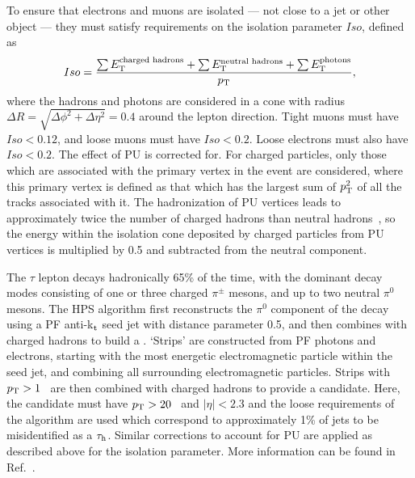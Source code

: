To ensure that electrons and muons are isolated --- not close to a jet or other object --- they must satisfy requirements on the isolation parameter $Iso$, defined as
\begin{equation}
Iso = \frac{\sum{\ET^{\text{charged hadrons}}}+ \sum{\ET^{\text{neutral hadrons}}}+ \sum{\ET^{\text{photons}}} }{\pt},
\end{equation} 
where the hadrons and photons are considered in a cone with radius $\Delta R=\sqrt{\Delta \phi ^{2} + \Delta \eta ^{2}}=0.4$ around the lepton direction.
Tight muons must have $Iso<0.12$, and loose muons must have $Iso<0.2$. 
Loose electrons must also have $Iso<0.2$.
The effect of \ac{PU} is corrected for. 
For charged particles, only those which are associated with the primary vertex in the event are considered, where this primary vertex is defined as that which has the largest sum of $p_{\text{T}}^{2}$ of all the tracks associated with it. 
The hadronization of \ac{PU} vertices leads to approximately twice 
the number of charged hadrons than neutral hadrons~\cite{deltabeta_htautau7tev}, 
so the energy within the isolation cone deposited by charged particles 
from \ac{PU} vertices is multiplied by 0.5 and subtracted from the neutral component.


The $\tau$ lepton decays hadronically 65\% of the time, with the dominant decay modes consisting of one or three charged $\pi^{\pm}$ mesons, and up to two neutral $\pi^{0}$ mesons.
The \ac{HPS} algorithm first reconstructs the $\pi^{0}$ component of the \tauh decay using a \ac{PF} anti-k$_{\rm t}$ seed jet with distance parameter 0.5, and then combines with charged hadrons to build a \tauh. 
`Strips' are constructed from \ac{PF} photons and electrons, starting with the most energetic electromagnetic particle within the seed jet, and combining all surrounding electromagnetic particles.
Strips with $p_{\text{T}} > 1$~\GeV{} are then combined with charged hadrons to provide a \tauh candidate. 
Here, the candidate must have $p_{\text{T}} > 20$~\GeV{} and $|\eta| < 2.3$ and the loose requirements of the algorithm are used which correspond to approximately 1\% of jets to be misidentified as a $\tau_\mathrm{h}$.
Similar corrections to account for \ac{PU} are applied as described above for the isolation parameter. 
More information can be found in Ref.~\cite{bib:HPStaus}. 



